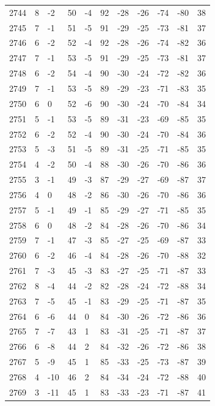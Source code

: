 \begin{table}[H]
\begin{tabular}{lllllllllll}
2744 & 8 & -2 & 50 & -4 & 92 & -28 & -26 & -74 & -80 & 38 \\
2745 & 7 & -1 & 51 & -5 & 91 & -29 & -25 & -73 & -81 & 37 \\
2746 & 6 & -2 & 52 & -4 & 92 & -28 & -26 & -74 & -82 & 36 \\
2747 & 7 & -1 & 53 & -5 & 91 & -29 & -25 & -73 & -81 & 37 \\
2748 & 6 & -2 & 54 & -4 & 90 & -30 & -24 & -72 & -82 & 36 \\
2749 & 7 & -1 & 53 & -5 & 89 & -29 & -23 & -71 & -83 & 35 \\
2750 & 6 & 0 & 52 & -6 & 90 & -30 & -24 & -70 & -84 & 34 \\
2751 & 5 & -1 & 53 & -5 & 89 & -31 & -23 & -69 & -85 & 35 \\
2752 & 6 & -2 & 52 & -4 & 90 & -30 & -24 & -70 & -84 & 36 \\
2753 & 5 & -3 & 51 & -5 & 89 & -31 & -25 & -71 & -85 & 35 \\
2754 & 4 & -2 & 50 & -4 & 88 & -30 & -26 & -70 & -86 & 36 \\
2755 & 3 & -1 & 49 & -3 & 87 & -29 & -27 & -69 & -87 & 37 \\
2756 & 4 & 0 & 48 & -2 & 86 & -30 & -26 & -70 & -86 & 36 \\
2757 & 5 & -1 & 49 & -1 & 85 & -29 & -27 & -71 & -85 & 35 \\
2758 & 6 & 0 & 48 & -2 & 84 & -28 & -26 & -70 & -86 & 34 \\
2759 & 7 & -1 & 47 & -3 & 85 & -27 & -25 & -69 & -87 & 33 \\
2760 & 6 & -2 & 46 & -4 & 84 & -28 & -26 & -70 & -88 & 32 \\
2761 & 7 & -3 & 45 & -3 & 83 & -27 & -25 & -71 & -87 & 33 \\
2762 & 8 & -4 & 44 & -2 & 82 & -28 & -24 & -72 & -88 & 34 \\
2763 & 7 & -5 & 45 & -1 & 83 & -29 & -25 & -71 & -87 & 35 \\
2764 & 6 & -6 & 44 & 0 & 84 & -30 & -26 & -72 & -86 & 36 \\
2765 & 7 & -7 & 43 & 1 & 83 & -31 & -25 & -71 & -87 & 37 \\
2766 & 6 & -8 & 44 & 2 & 84 & -32 & -26 & -72 & -86 & 38 \\
2767 & 5 & -9 & 45 & 1 & 85 & -33 & -25 & -73 & -87 & 39 \\
2768 & 4 & -10 & 46 & 2 & 84 & -34 & -24 & -72 & -88 & 40 \\
2769 & 3 & -11 & 45 & 1 & 83 & -33 & -23 & -71 & -87 & 41 \\

\end{tabular}
\end{table}
